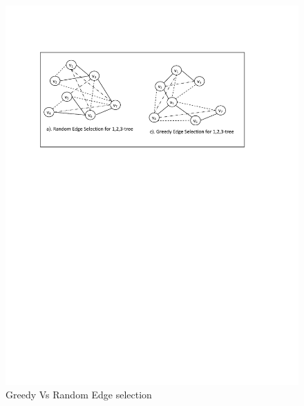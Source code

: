 \documentclass[12pt]{article}
\begin{document}
\begin{figure}
\begin{minipage}{.9\linewidth}
\includegraphics[width=6 in, height=2.8 in]{Edge_selection1.pdf}
\caption{Greedy Vs Random Edge selection}
\label{Fig:ES}
\end{minipage}
\end{figure}
\end{document}
